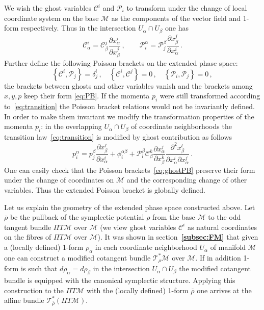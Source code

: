 \documentclass[a4paper,11pt,oneside]{amsart}
\theoremstyle{plain}
\numberwithin{equation}{section} %
\numberwithin{figure}{section} %
\newcommand{\bref}[1]{{\bf \ref{#1}}}
\newcommand{\pb}[2]{\left\{{}#1{},{}#2{}\right\}}
\def\bar{\overline}
\def\d{\partial}
\newcommand{\ddl}[2]{\displaystyle\frac{{\d #1}}{\d #2}}
\def\cP{{\mathcal P}}
\def\cc{{\mathcal C}}
\def\mod{{\mathcal T}^*_\rho}
\def\modbar{{\mathcal T}^*_{\bar\rho}}
\def\manM{{\mathcal M}}
\begin{document}
\noindent
We wish the ghost variables $\cc^i$ and $\cP_i$ to transform under the
change of local coordinate system on the base $\manM$ as the components
of the vector field and 1-form respectively. Thus in the intersection
$U_\alpha \cap U_\beta$ one has
\begin{equation}
\cc^i_{\alpha}=\cc^j_\beta \ddl{x^i_\alpha}{x^j_\beta}\,, \qquad
\cP^\alpha_i=\cP^\beta_j \ddl{x^j_\beta}{x^i_\alpha}\,.
\end{equation}
Further define the following Poisson brackets on the extended
phase space:
\begin{equation}
\label{eq:ghostPB}
\pb{\cc^i}{\cP_j}=\delta^i_j\,, \quad \pb{\cc^i}{\cc^j}=0 \,, \quad
\pb{\cP_i}{\cP_j}=0 \,,
\end{equation}
the brackets between ghosts and other variables
vanish and the brackets among $x,y,p$ keep
their form \eqref{eq:PB}.  If the momenta $p_i$ were still
transformed according to~\eqref{eq:transition}
the Poisson bracket relations would not be
invariantly defined.  In order to make them
invariant we modify the transformation properties
of the momenta $p_i$: in the overlapping
$U_\alpha \cap U_\beta$ of coordinate neighborhoods
the transition law~\eqref{eq:transition} is modified
by ghost contribution as follows
\begin{equation}
        \label{eq:p-transform}
p^\alpha_i=p^\beta_j \frac{\d x^j_\beta}{\d x^i_\alpha}
        +\phi^{\alpha \beta}_i
+\cP^\beta_l \cc_\beta^k
\frac{\d x^j_\alpha}{\d x^k_\beta}
        \frac{\d^2{x^l_\beta}}{\d x_\alpha^i \d x_\alpha^j}\,.
\end{equation}
One can easily check that the Poisson brackets~\eqref{eq:ghostPB}
preserve their form under the change of coordinates on $\manM$
and the corresponding change of other variables.  Thus the
extended Poisson bracket is globally defined.


\noindent
Let us explain the geometry of the extended phase space
constructed above. Let $\bar \rho$ be the pullback of the
symplectic potential $\rho$ from the base $\manM$ to the odd
tangent bundle $\Pi T \manM$ over $\manM$
(we view ghost variables $\cc^i$ as natural coordinates
on the fibres of $\Pi T \manM$ over $\manM$). It was shown
in section~\bref{subsec:FM} that
given a (locally defined) 1-form $\rho_\alpha$
in each coordinate neighborhood $U_\alpha$ of
manifold $\manM$ one can construct a modified cotangent
bundle $\mod\manM$ over $\manM$.  If in addition 1-form is such
that $d\rho_\alpha=d\rho_\beta$ in the intersection
$U_\alpha \cap U_\beta$ the modified cotangent bundle
is equipped with the canonical symplectic
structure.  Applying this construction
to the $\Pi T \manM$ with the (locally defined) 1-form $\bar\rho$
one arrives at the affine bundle $\modbar(\Pi T \manM)$.
\end{document}
